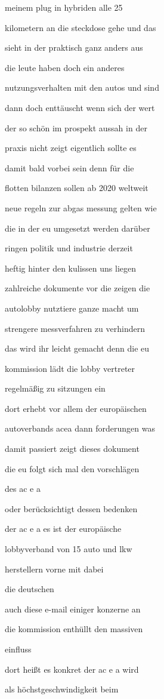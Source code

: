 \documentclass[a4paper, 11pt]{book} %
\begin{document}
meinem plug in hybriden alle 25

kilometern an die steckdose gehe und das

sieht in der praktisch ganz anders aus

die leute haben doch ein anderes

nutzungsverhalten mit den autos und sind

dann doch enttäuscht wenn sich der wert

der so schön im prospekt aussah in der

praxis nicht zeigt eigentlich sollte es

damit bald vorbei sein denn für die

flotten bilanzen sollen ab 2020 weltweit

neue regeln zur abgas messung gelten wie

die in der eu umgesetzt werden darüber

ringen politik und industrie derzeit

heftig hinter den kulissen uns liegen

zahlreiche dokumente vor die zeigen die

autolobby nutztiere ganze macht um

strengere messverfahren zu verhindern

das wird ihr leicht gemacht denn die eu

kommission lädt die lobby vertreter

regelmäßig zu sitzungen ein

dort erhebt vor allem der europäischen

autoverbands acea dann forderungen was

damit passiert zeigt dieses dokument

die eu folgt sich mal den vorschlägen

des ac e a

oder berücksichtigt dessen bedenken

der ac e a es ist der europäische

lobbyverband von 15 auto und lkw

herstellern vorne mit dabei

die deutschen

auch diese e-mail einiger konzerne an

die kommission enthüllt den massiven

einfluss

dort heißt es konkret der ac e a wird

als höchstgeschwindigkeit beim
\end{document}
